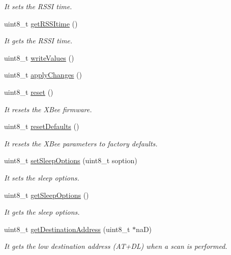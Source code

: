 \begin{DoxyCompactItemize}
\begin{DoxyCompactList}\small\item\em It sets the R\+S\+SI time. \end{DoxyCompactList}\item 
uint8\+\_\+t \hyperlink{class_wasp_x_bee_core_a572462247769b06f0c4d1f65a0ef9c42}{get\+R\+S\+S\+Itime} ()
\begin{DoxyCompactList}\small\item\em It gets the R\+S\+SI time. \end{DoxyCompactList}\item 
uint8\+\_\+t \hyperlink{class_wasp_x_bee_core_aae5991a665d6a4b841cf99f98114457d}{write\+Values} ()
\item 
uint8\+\_\+t \hyperlink{class_wasp_x_bee_core_ac7c18ce9cadc85fe984c95f2b969d05f}{apply\+Changes} ()
\item 
uint8\+\_\+t \hyperlink{class_wasp_x_bee_core_adb05ad7b2a13f1bea8dc219282e3ba50}{reset} ()
\begin{DoxyCompactList}\small\item\em It resets the X\+Bee firmware. \end{DoxyCompactList}\item 
uint8\+\_\+t \hyperlink{class_wasp_x_bee_core_a906fba68cacc172fe532ba8368dfad3a}{reset\+Defaults} ()
\begin{DoxyCompactList}\small\item\em It resets the X\+Bee parameters to factory defaults. \end{DoxyCompactList}\item 
uint8\+\_\+t \hyperlink{class_wasp_x_bee_core_a4ccf30a905fdd452023c1926b41ba472}{set\+Sleep\+Options} (uint8\+\_\+t soption)
\begin{DoxyCompactList}\small\item\em It sets the sleep options. \end{DoxyCompactList}\item 
uint8\+\_\+t \hyperlink{class_wasp_x_bee_core_a66016f51091d27b46311109ad14aca0d}{get\+Sleep\+Options} ()
\begin{DoxyCompactList}\small\item\em It gets the sleep options. \end{DoxyCompactList}\item 
uint8\+\_\+t \hyperlink{class_wasp_x_bee_core_a1fdba9a7e6c5606c7c02d22b43b14678}{get\+Destination\+Address} (uint8\+\_\+t $\ast$naD)
\begin{DoxyCompactList}\small\item\em It gets the low destination address (A\+T+\+DL) when a scan is performed. \end{DoxyCompactList}\item 

\end{DoxyCompactItemize}
